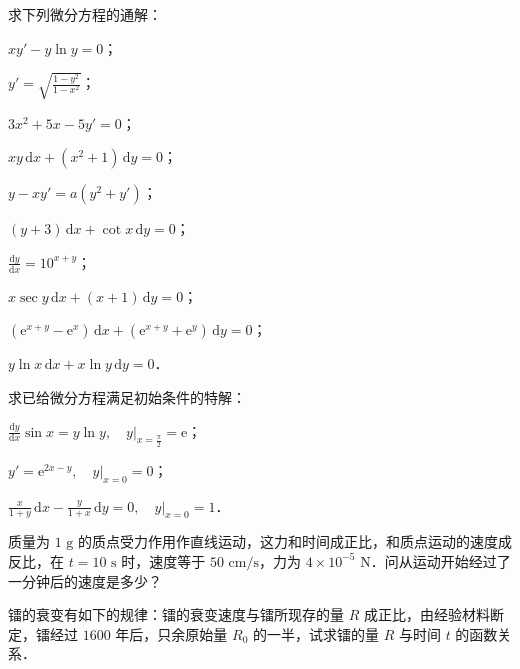 \begin{xiti}
\item 求下列微分方程的通解：
\begin{ziti}
\item $xy' - y\ln y = 0$；
\item $y' = \sqrt{\frac{1 - y^2}{1 - x^2}}$；
\item $3x^2 + 5x - 5y' = 0$；
\item $xy\,\mathrm{d}x + (x^2 + 1)\,\mathrm{d}y = 0$；
\item $y - xy' = a(y^2 + y')$；
\item $(y + 3)\,\mathrm{d}x + \cot x\,\mathrm{d}y = 0$；
\item $\frac{\mathrm{d}y}{\mathrm{d}x} = 10^{x+y}$；
\item $x\sec y\,\mathrm{d}x + (x + 1)\,\mathrm{d}y = 0$；
\item $(\mathrm{e}^{x+y} - \mathrm{e}^x)\,\mathrm{d}x + (\mathrm{e}^{x+y} + \mathrm{e}^y)\,\mathrm{d}y = 0$；
\item $y\ln x\,\mathrm{d}x + x\ln y\,\mathrm{d}y = 0$．
\end{ziti}

\item 求已给微分方程满足初始条件的特解：
\begin{ziti}
\item $\frac{\mathrm{d}y}{\mathrm{d}x}\sin x = y\ln y, \quad y\big|_{x=\frac{\pi}{2}} = \mathrm{e}$；
\item $y' = \mathrm{e}^{2x - y}, \quad y\big|_{x=0} = 0$；
\item $\frac{x}{1+y}\,\mathrm{d}x - \frac{y}{1+x}\,\mathrm{d}y = 0, \quad y\big|_{x=0} = 1$．
\end{ziti}

\item 质量为 $1\text{ g}$ 的质点受力作用作直线运动，这力和时间成正比，和质点运动的速度成反比，在 $t = 10\text{ s}$ 时，速度等于 $50\text{ cm/s}$，力为 $4 \times 10^{-5}\text{ N}$．问从运动开始经过了一分钟后的速度是多少？

\item 镭的衰变有如下的规律：镭的衰变速度与镭所现存的量 $R$ 成正比，由经验材料断定，镭经过 $1600$ 年后，只余原始量 $R_0$ 的一半，试求镭的量 $R$ 与时间 $t$ 的函数关系．
\end{xiti}
